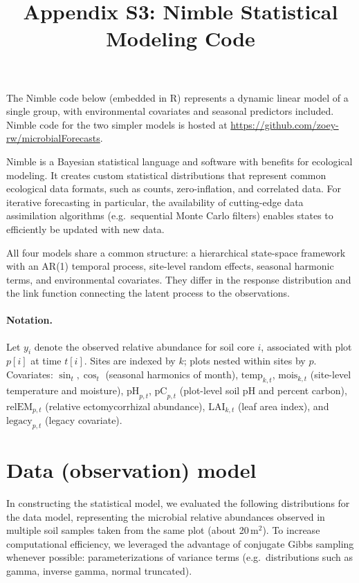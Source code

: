 \documentclass[11pt]{article}
\title{Appendix S3: Nimble Statistical Modeling Code}
\author{}
\date{}
\begin{document}
\maketitle

The Nimble code below (embedded in R) represents a dynamic linear model of a single group, with environmental covariates and seasonal predictors included. Nimble code for the two simpler models is hosted at \url{https://github.com/zoey-rw/microbialForecasts}.

Nimble is a Bayesian statistical language and software with benefits for ecological modeling. It creates custom statistical distributions that represent common ecological data formats, such as counts, zero-inflation, and correlated data. For iterative forecasting in particular, the availability of cutting-edge data assimilation algorithms (e.g.\ sequential Monte Carlo filters) enables states to efficiently be updated with new data.

All four models share a common structure: a hierarchical state-space framework with an AR(1) temporal process, site-level random effects, seasonal harmonic terms, and environmental covariates. They differ in the response distribution and the link function connecting the latent process to the observations.

\paragraph{Notation.}
Let $y_{i}$ denote the observed relative abundance for soil core $i$, associated with plot $p[i]$ at time $t[i]$.
Sites are indexed by $k$; plots nested within sites by $p$.
Covariates: $\sin_t, \cos_t$ (seasonal harmonics of month), $\mathrm{temp}_{k,t}$, $\mathrm{mois}_{k,t}$ (site-level temperature and moisture), $\mathrm{pH}_{p,t}$, $\mathrm{pC}_{p,t}$ (plot-level soil pH and percent carbon), $\mathrm{relEM}_{p,t}$ (relative ectomycorrhizal abundance), $\mathrm{LAI}_{k,t}$ (leaf area index), and $\mathrm{legacy}_{p,t}$ (legacy covariate).


\section{Data (observation) model}

In constructing the statistical model, we evaluated the following distributions for the data model, representing the microbial relative abundances observed in multiple soil samples taken from the same plot (about 20\,m$^2$). To increase computational efficiency, we leveraged the advantage of conjugate Gibbs sampling whenever possible: parameterizations of variance terms (e.g.\ distributions such as gamma, inverse gamma, normal truncated).
\end{document}

